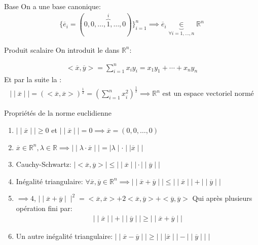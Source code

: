 \begin{parag}{Base}
    On a une base canonique:
    \begin{align*}
        \{ \overline{e}_i = (0, 0, \dots, \overbrace{1}^{i}, \dots, 0)\}_{i=1}^n \implies \overline{e}_i \underbrace{\in}_{ \forall i = 1, \dots, n} \mathbb{R}^n
    \end{align*}

    
\end{parag}

    
\begin{parag}{Produit scalaire}
    On introduit le  dans $ \mathbb{R}^n$:
    \begin{definition}
        \begin{align*}
        < \overline{x}, \overline{y}> =  \sum_{i=1}^n x_i y_i = x_1y_1 + \cdots  + x_ny_n
    \end{align*}
    Et par la suite la :
    \begin{align*}
        \mid  \mid \overline{x} \mid  \mid  = ( < \overline{x}, \overline{x}>)^{ \frac{1}{2}} = ( \sum_{i=1}^n x_i^2)^{ \frac{1}{2}} \implies \mathbb{R}^n \text{ est un espace vectoriel normé}
    \end{align*}
    \end{definition}
   \begin{subparag}{Propriétés de la norme euclidienne}
       \begin{enumerate}
           \item $ \mid  \mid \overline{x} \mid  \mid \geq 0$ et $ \mid \mid  \overline{x} \mid  \mid  = 0 \implies \overline{x} = (0, 0, \dots, 0)$
           \item $ \overline{x} \in \mathbb{R}^n, \lambda \in \mathbb{R} \implies \mid  \mid  \lambda \cdot \overline{x} \mid  \mid  = \mid  \lambda \mid \cdot \mid  \mid \overline{x} \mid  \mid $
           \item Cauchy-Schwartz: $ \mid < \overline{x}, \overline{y}> \mid \leq \mid \mid \overline{x} \mid \mid \cdot \mid \mid \overline{y} \mid \mid $
               \item Inégalité triangulaire: $ \forall \overline{x}, \overline{y} \in \mathbb{R}^n \implies \mid \mid \overline{x}+ \overline{y} \mid \mid \leq \mid \mid \overline{x} \mid \mid  + \mid \mid \overline{y} \mid \mid $ 
               \item $ \implies 4$, $ \mid \mid \overline{x} + \overline{y} \mid \mid^2 = < \overline{x}, \overline{x}> + 2< \overline{x}, \overline{y}> + < \overline{y}, \overline{y}>$ Qui après plusieurs opération fini par:
                   \begin{align*}
                       \mid \mid \overline{x} \mid \mid + \mid \mid \overline{y} \mid \mid  \geq \mid \mid \overline{x} + \overline{y} \mid \mid 
                   \end{align*}
               \item Un autre inégalité triangulaire: $ \mid \mid \overline{x} - \overline{y} \mid \mid  \geq \mid \mid \mid \overline{x} \mid \mid  - \mid \mid  \overline{y} \mid \mid  \mid$
       \end{enumerate}
       

\end{subparag}
\end{parag}
